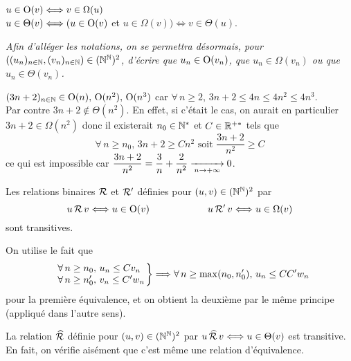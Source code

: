 	\begin{Remarque} \(u \in \rm{O}(v) \iff v \in \Omega(u)\) \\
	\hspace*{24.5mm} \(u \in \Theta(v) \iff (u \in \rm{O}(v)\) et \(u \in \Omega(v)) \iff v \in \Theta(u)\). \end{Remarque} \vspace{2mm}
	\begin{center}
		\textit{Afin d'alléger les notations, on se permettra désormais, pour \(((u_n)_{n \in \bb{N}}, (v_n)_{n \in \bb{N}}) \in (\bb{N}^\bb{N})^2\), d'écrire que \(u_n \in \rm{O}(v_n)\), que \(u_n \in \Omega(v_n)\) ou que \(u_n \in \Theta(v_n)\).}
	\end{center}
	\vspace{2mm}
	\begin{Exemple} \((3n+2)_{n \in \bb{N}} \in \rm{O}(n), \, \rm{O}(n^2), \, \rm{O}(n^3)\) car \(\forall \, n \geq 2, \, 3n+2 \leq 4n \leq 4n^2 \leq 4n^3\). \\[2mm]
	Par contre \(3n+2 \notin \Theta(n^2)\). En effet, si c'était le cas, on aurait en particulier \(3n+2 \in \Omega(n^2)\) donc il existerait \(n_0 \in \bb{N}^*\) et \(C \in \bb{R}^{+*}\) tels que
		\[\forall \, n \geq n_0, \, 3n+2 \geq Cn^2 \text{ soit } \displaystyle \frac{3n+2}{n^2} \geq C\]
	ce qui est impossible car \(\displaystyle \frac{3n+2}{n^2} = \frac{3}{n} + \frac{2}{n^2} \ntoinf 0\). \end{Exemple}
	
	\eqskip{1mm}
	\begin{Propriete}
		Les relations binaires \(\cal{R}\) et \(\cal{R}'\) définies pour \((u,v) \in (\bb{N}^\bb{N})^2\) par
			\[
				u \, \cal{R} \, v \iff u \in \rm{O}(v) \qquad \qquad \qquad u \, \cal{R'} \, v \iff u \in \Omega(v)
			\]
		sont transitives.
	\end{Propriete}
	\eqskip{2mm}
	
	\begin{Preuve}
		On utilise le fait que \[
			\left. \begin{tabular}[h]{l}
				\(\forall \, n \geq n_0, \, u_n \leq Cv_n\) \\
				\(\forall \, n \geq n_0', \, v_n \leq C'w_n\)
			\end{tabular} \!\!\! \right\} \Longrightarrow
		\forall \, n \geq \max(n_0,n_0'), \, u_n \leq CC'w_n
		\]
		pour la première équivalence, et on obtient la deuxième par le même principe (appliqué dans l'autre sens).
	\end{Preuve}
	 La relation \(\widehat{\cal{R}}\) définie pour \((u,v) \in (\bb{N}^\bb{N})^2\) par \(u \,\widehat{\cal{R}}\, v \iff u \in \Theta(v)\) est transitive. En fait, on vérifie aisément que c'est même une relation d'équivalence.
	
